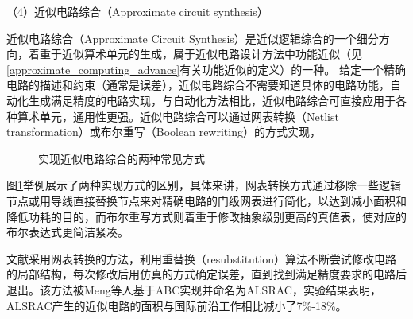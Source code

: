 （4）近似电路综合（Approximate circuit synthesis）

近似电路综合（Approximate Circuit Synthesis）\cite{AC:ALS:survey}是近似逻辑综合的一个细分方向，着重于近似算术单元的生成，属于近似电路设计方法中功能近似（见\ref{approximate_computing_advance}有关功能近似的定义）的一种。
给定一个精确电路的描述和约束（通常是误差），近似电路综合不需要知道具体的电路功能，自动化生成满足精度的电路实现，与自动化方法相比，近似电路综合可直接应用于各种算术单元，通用性更强。近似电路综合可以通过网表转换（Netlist transformation）或布尔重写（Boolean rewriting）的方式实现，
\begin{figure}[!htb]
    \centering
\caption{实现近似电路综合的两种常见方式}
\label{AC:ALS:survey_ACS_two_methods}
\end{figure}
图\ref{AC:ALS:survey_ACS_two_methods}举例展示了两种实现方式的区别，具体来讲，网表转换方式通过移除一些逻辑节点或用导线直接替换节点来对精确电路的门级网表进行简化，以达到减小面积和降低功耗的目的，而布尔重写方式则着重于修改抽象级别更高的真值表，使对应的布尔表达式更简洁紧凑。

文献\cite{AC:ALS:ALSRAC}采用网表转换的方法，利用重替换（resubstitution）算法\cite{LS:resub}不断尝试修改电路的局部结构，每次修改后用仿真的方式确定误差，直到找到满足精度要求的电路后退出。该方法被Meng等人基于ABC\cite{LS:ABC}实现并命名为ALSRAC，实验结果表明，ALSRAC产生的近似电路的面积与国际前沿工作相比减小了7\%-18\%。


